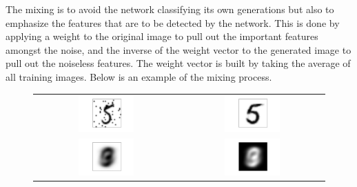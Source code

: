 \documentclass{report}
\begin{document}
The mixing is to avoid the network classifying its own generations but also to emphasize the features that are to be detected by the network. This is done by applying a weight to the original image to pull out the important features amongst the noise, and the inverse of the weight vector to the generated image to pull out the noiseless features. The weight vector is built by taking the average of all training images. Below is an example of the mixing process.

\begin{figure}
\begin{center}
\begin{tabular}{c  c}
\includegraphics[width=0.4\textwidth]{imp_test_digit} & \includegraphics[width=0.4\textwidth]{generated} \\
\includegraphics[width=0.4\textwidth]{weights} & \includegraphics[width=0.4\textwidth]{inv_weights} \\

\end{tabular}
\end{center}
\end{figure}
\end{document}
